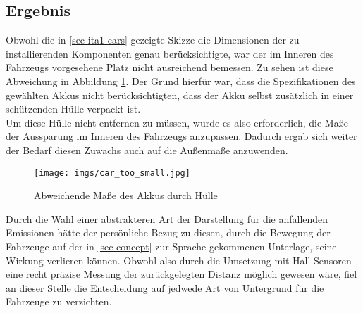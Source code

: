 \documentclass[.../Dokumentation.tex]{subfiles}
\begin{document}
\subsection{Ergebnis}\label{sec-ita1-result}
Obwohl die in \ref{sec-ita1-cars} gezeigte Skizze die Dimensionen der zu 
installierenden Komponenten genau berücksichtigte, war der im Inneren des 
Fahrzeugs vorgesehene Platz nicht ausreichend bemessen.
Zu sehen ist diese Abweichung in Abbildung \ref{fig-car-too-small}.
Der Grund hierfür war, dass die Spezifikationen des gewählten Akkus nicht 
berücksichtigten, dass der Akku selbst zusätzlich in einer schützenden Hülle 
verpackt ist.\\
Um diese Hülle nicht entfernen zu müssen, wurde es also erforderlich, die 
Maße der Aussparung im Inneren des Fahrzeugs anzupassen. Dadurch ergab 
sich weiter der Bedarf diesen Zuwachs auch auf die Außenmaße anzuwenden.\\
\begin{figure}[H]
    \begin{center}
    \texttt{[image: imgs/car\_too\_small.jpg]}
    \caption{Abweichende Maße des Akkus durch Hülle}
    \label{fig-car-too-small}
    \end{center}
\end{figure}
\noindent
Durch die Wahl einer abstrakteren Art der Darstellung für die anfallenden 
Emissionen hätte der persönliche Bezug zu diesen, durch die Bewegung der 
Fahrzeuge auf der in \ref{sec-concept} zur Sprache gekommenen Unterlage, seine 
Wirkung verlieren können. Obwohl also durch die Umsetzung mit Hall Sensoren 
eine recht präzise Messung der zurückgelegten Distanz möglich gewesen wäre, 
fiel an dieser Stelle die Entscheidung auf jedwede Art von Untergrund 
für die Fahrzeuge zu verzichten.
\end{document}
